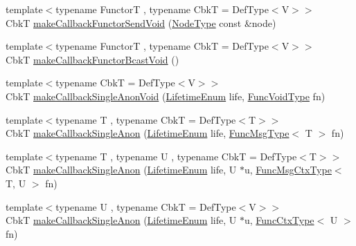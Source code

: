 \begin{DoxyCompactItemize}
\item 
{\footnotesize template$<$typename FunctorT , typename CbkT  = Def\+Type$<$\+V$>$$>$ }\\CbkT \hyperlink{structvt_1_1pipe_1_1_pipe_manager_t_l_ac2c128da30637e0672086df5abea84a3}{make\+Callback\+Functor\+Send\+Void} (\hyperlink{namespacevt_a866da9d0efc19c0a1ce79e9e492f47e2}{Node\+Type} const \&node)
\item 
{\footnotesize template$<$typename FunctorT , typename CbkT  = Def\+Type$<$\+V$>$$>$ }\\CbkT \hyperlink{structvt_1_1pipe_1_1_pipe_manager_t_l_a51f15a63c39eeef9ff73572711363bba}{make\+Callback\+Functor\+Bcast\+Void} ()
\item 
{\footnotesize template$<$typename CbkT  = Def\+Type$<$\+V$>$$>$ }\\CbkT \hyperlink{structvt_1_1pipe_1_1_pipe_manager_t_l_ae239877cc157e7f5c95aa96421b7e1bb}{make\+Callback\+Single\+Anon\+Void} (\hyperlink{namespacevt_1_1pipe_acb42b284378c0fdac1d7c6335dc26f58}{Lifetime\+Enum} life, \hyperlink{structvt_1_1pipe_1_1_pipe_manager_base_acd6f0c71f38f08d53f85e83b65406d77}{Func\+Void\+Type} fn)
\item 
{\footnotesize template$<$typename T , typename CbkT  = Def\+Type$<$\+T$>$$>$ }\\CbkT \hyperlink{structvt_1_1pipe_1_1_pipe_manager_t_l_ad3ee09b4e7976de176b14d76d70b2bdb}{make\+Callback\+Single\+Anon} (\hyperlink{namespacevt_1_1pipe_acb42b284378c0fdac1d7c6335dc26f58}{Lifetime\+Enum} life, \hyperlink{structvt_1_1pipe_1_1_pipe_manager_base_aa54eee64ab32a27777a672d49eb861f4}{Func\+Msg\+Type}$<$ T $>$ fn)
\item 
{\footnotesize template$<$typename T , typename U , typename CbkT  = Def\+Type$<$\+T$>$$>$ }\\CbkT \hyperlink{structvt_1_1pipe_1_1_pipe_manager_t_l_a59f0de1aaa6ab7ea6b0eac0667b495f7}{make\+Callback\+Single\+Anon} (\hyperlink{namespacevt_1_1pipe_acb42b284378c0fdac1d7c6335dc26f58}{Lifetime\+Enum} life, U $\ast$u, \hyperlink{structvt_1_1pipe_1_1_pipe_manager_base_a73fdf82ece0411b3dc644c99b763f7a9}{Func\+Msg\+Ctx\+Type}$<$ T, U $>$ fn)
\item 
{\footnotesize template$<$typename U , typename CbkT  = Def\+Type$<$\+V$>$$>$ }\\CbkT \hyperlink{structvt_1_1pipe_1_1_pipe_manager_t_l_a4bdcd4bf9730aa312336568d005e6d01}{make\+Callback\+Single\+Anon} (\hyperlink{namespacevt_1_1pipe_acb42b284378c0fdac1d7c6335dc26f58}{Lifetime\+Enum} life, U $\ast$u, \hyperlink{structvt_1_1pipe_1_1_pipe_manager_base_ad8463823b6b4cfdb67c119d6d22e3bac}{Func\+Ctx\+Type}$<$ U $>$ fn)

\end{DoxyCompactItemize}
